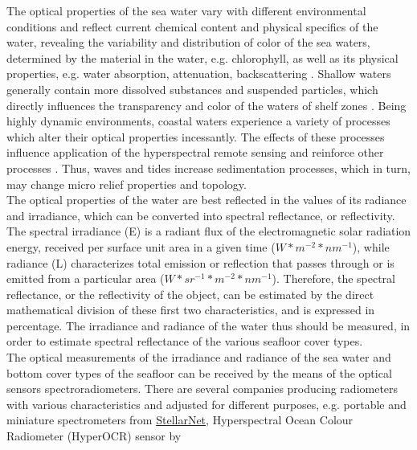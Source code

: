\documentclass[11pt]{article}
\begin{document}
The optical properties of the sea water vary with different environmental conditions and reflect
current chemical content and physical specifics of the water, revealing the variability and distribution
of color of the sea waters, determined by the material in the water, e.g. chlorophyll, as well as its
physical properties, e.g. water absorption, attenuation, backscattering \cite{Maffione01a}\label{Maffione01a}.
Shallow waters generally contain more dissolved substances and suspended particles, which directly
influences the transparency and color of the waters of shelf zones \cite{Jerlov52}\label{Jerlov52}. Being highly
dynamic environments, coastal waters experience a variety of processes which alter their optical
properties incessantly. The effects of these processes influence application of the hyperspectral
remote sensing and reinforce other processes \cite{Maffione01b}\label{Maffione01b}. Thus, waves and tides increase
sedimentation processes, which in turn, may change micro relief properties and topology. \\
The optical properties of the water are best reflected in the values of its radiance and irradiance,
which can be converted into spectral reflectance, or reflectivity. The spectral irradiance (E) is a
radiant flux of the electromagnetic solar radiation energy, received per surface unit area in a given
time ($W*m^{−2}*nm^{−1}$), while radiance (L) characterizes total emission or reflection that passes through
or is emitted from a particular area ($W*sr^{−1}*m^{−2}*nm^{−1}$). Therefore, the spectral reflectance, or the
reflectivity of the object, can be estimated by the direct mathematical division of these first two
characteristics, and is expressed in percentage.
The irradiance and radiance of the water thus should be measured, in order to estimate spectral
reflectance of the various seafloor cover types. \\
The optical measurements of the irradiance and radiance of the sea water and bottom cover types of the seafloor can be received by the means of the
optical sensors spectroradiometers. There are several companies producing radiometers with various
characteristics and adjusted for different purposes, e.g. portable and miniature spectrometers from
\href{http://www.stellarnet.us}{StellarNet}, Hyperspectral Ocean Colour Radiometer (HyperOCR) sensor by
\end{document}

